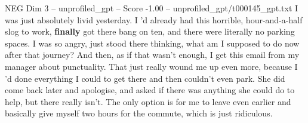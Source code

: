 \begin{textsample}{NEG Dim 3 – unprofiled\_gpt – Score -1.00 – unprofiled\_gpt/t000145\_gpt.txt}  \label{ex:f3_neg_011}
I was just absolutely livid yesterday.
I ’d already had this horrible, hour-and-a-half slog to work, \textbf{finally} got there bang on ten, and there were literally no parking spaces.
I was so angry, just stood there thinking, what am I supposed to do now after that journey?
And then, as if that wasn't enough, I get this email from my manager about punctuality.
That just really wound me up even more, because I ’d done everything I could to get there and then couldn't even park.
She did come back later and apologise, and asked if there was anything she could do to help, but there really isn't.
The only option is for me to leave even earlier and basically give myself two hours for the commute, which is just ridiculous.

\end{textsample}
